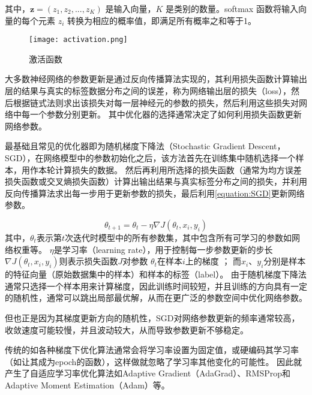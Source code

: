 其中，$\mathbf{z} = (z_1, z_2, ..., z_K)$ 是输入向量，$K$ 是类别的数量。softmax 函数将输入向量的每个元素 $z_i$ 转换为相应的概率值，即满足所有概率之和等于1。



\begin{figure}[h]
  \centering
\texttt{[image: activation.png]}
\caption{激活函数}
\label{figure:activation}
  
\end{figure}



大多数神经网络的参数更新是通过反向传播算法实现的，其利用损失函数计算输出层的结果与真实的标签数据分布之间的误差，称为网络输出层的损失（loss），然后根据链式法则求出该损失对每一层神经元的参数的损失，然后利用这些损失对网络中每一个参数分别更新。
其中优化器的选择通常决定了如何利用损失函数更新网络参数。

最基础且常见的优化器即为随机梯度下降法（Stochastic Gradient Descent，SGD），在网络模型中的参数初始化之后，该方法首先在训练集中随机选择一个样本，用作本轮计算损失的数据。
然后再利用所选择的损失函数（通常为均方误差损失函数或交叉熵损失函数）计算出输出结果与真实标签分布之间的损失，并利用反向传播算法求出每一步用于更新参数的损失，最后利用\cref{equation:SGD}更新网络参数。

\begin{equation}
  \label{equation:SGD}
  \theta_{t+1} = \theta_{t} - \eta \nabla J(\theta_{t}, x_i, y_i)
\end{equation}
其中，$\theta_{t}$表示第$t$次迭代时模型中的所有参数集，其中包含所有可学习的参数如网络权重等。
$\eta$是学习率（learning rate），用于控制每一步参数更新的步长
$\nabla J(\theta_{t}, x_i, y_i)$则表示损失函数$J$对参数 $\theta_{t}$在样本$i$上的梯度 ；
而$x_i$、$y_i$分别是样本的特征向量（原始数据集中的样本）和样本的标签（label）。
由于随机梯度下降法通常只选择一个样本用来计算梯度，因此训练时间较短，并且训练的方向具有一定的随机性，通常可以跳出局部最优解，从而在更广泛的参数空间中优化网络参数。

但也正是因为其梯度更新方向的随机性，SGD对网络参数更新的频率通常较高，收敛速度可能较慢，并且波动较大，从而导致参数更新不够稳定。

传统的如各种梯度下优化算法通常会将学习率设置为固定值，或硬编码其学习率（如让其成为epoch的函数），这样做就忽略了学习率其他变化的可能性。
因此就产生了自适应学习率优化算法如Adaptive Gradient（AdaGrad）、RMSProp和Adaptive Moment Estimation（Adam）等。

